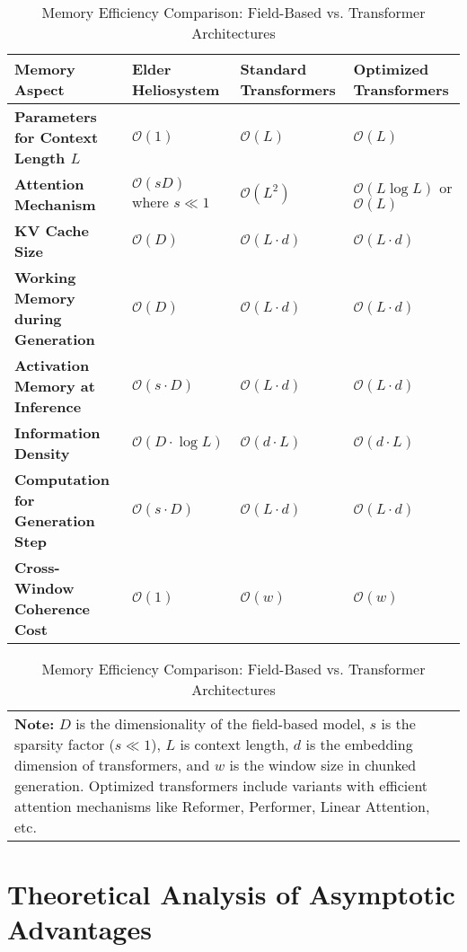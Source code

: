 \begin{table}[ht]
\centering
\caption{Memory Efficiency Comparison: Field-Based vs. Transformer Architectures}
\begin{tabular}{|p{3.5cm}|p{3.5cm}|p{3.5cm}|p{3.5cm}|}
\hline
\textbf{Memory Aspect} & \textbf{Elder Heliosystem} & \textbf{Standard Transformers} & \textbf{Optimized Transformers} \\
\hline
\textbf{Parameters for Context Length $L$} & $\mathcal{O}(1)$ & $\mathcal{O}(L)$ & $\mathcal{O}(L)$ \\
\hline
\textbf{Attention Mechanism} & $\mathcal{O}(sD)$ where $s \ll 1$ & $\mathcal{O}(L^2)$ & $\mathcal{O}(L \log L)$ or $\mathcal{O}(L)$ \\
\hline
\textbf{KV Cache Size} & $\mathcal{O}(D)$ & $\mathcal{O}(L \cdot d)$ & $\mathcal{O}(L \cdot d)$ \\
\hline
\textbf{Working Memory during Generation} & $\mathcal{O}(D)$ & $\mathcal{O}(L \cdot d)$ & $\mathcal{O}(L \cdot d)$ \\
\hline
\textbf{Activation Memory at Inference} & $\mathcal{O}(s \cdot D)$ & $\mathcal{O}(L \cdot d)$ & $\mathcal{O}(L \cdot d)$ \\
\hline
\textbf{Information Density} & $\mathcal{O}(D \cdot \log L)$ & $\mathcal{O}(d \cdot L)$ & $\mathcal{O}(d \cdot L)$ \\
\hline
\textbf{Computation for Generation Step} & $\mathcal{O}(s \cdot D)$ & $\mathcal{O}(L \cdot d)$ & $\mathcal{O}(L \cdot d)$ \\
\hline
\textbf{Cross-Window Coherence Cost} & $\mathcal{O}(1)$ & $\mathcal{O}(w)$ & $\mathcal{O}(w)$ \\
\hline
\end{tabular}

\begin{tabular}{p{15cm}}
\textbf{Note:} $D$ is the dimensionality of the field-based model, $s$ is the sparsity factor ($s \ll 1$), $L$ is context length, $d$ is the embedding dimension of transformers, and $w$ is the window size in chunked generation. Optimized transformers include variants with efficient attention mechanisms like Reformer, Performer, Linear Attention, etc.
\end{tabular}
\end{table}

\section{Theoretical Analysis of Asymptotic Advantages}

